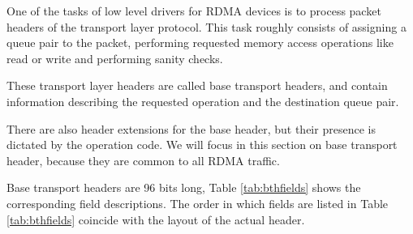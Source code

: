 One of the tasks of low level drivers for RDMA devices is to process
packet headers of the transport layer protocol. This task roughly consists
of assigning a queue pair to the packet, performing requested memory access operations like
read or write and performing sanity checks.

These transport layer headers are called
base transport headers, and contain information describing the
requested operation and the  destination queue pair.

There are also header extensions for the base header, but their presence is dictated
by the operation code. We will focus in this section on base transport header,
because they are common to all RDMA traffic.

Base transport headers are 96 bits long, Table
\ref{tab:bthfields} shows the corresponding field descriptions. The order in which fields
are listed in Table \ref{tab:bthfields} coincide with the layout of the actual header.

